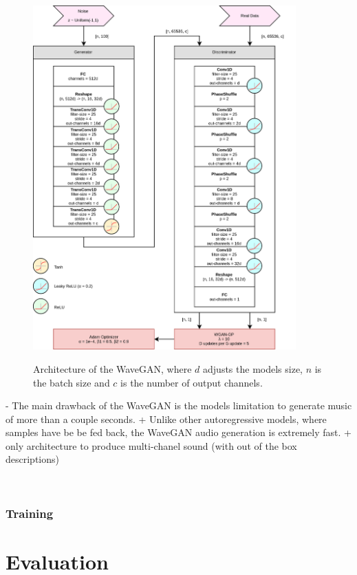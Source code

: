 \documentclass[12pt]{article}
\begin{document}
\begin{figure}
\includegraphics[width=0.9\textwidth]{img/wavegan-arch.png}
\label{fig:WaveGan-arch}
\caption{Architecture of the WaveGAN, where $d$ adjusts the models size, $n$ is the batch size and $c$ is the number of output channels.}%
\end{figure}




- The main drawback of the WaveGAN is the models limitation to generate music of more than a couple seconds.
+ Unlike other autoregressive models, where samples have be be fed back, the WaveGAN audio generation is extremely fast.
+ only architecture to produce multi-chanel sound (with out of the box descriptions)

 
 
\cite{donahue2018adversarial} %


\subsubsection{Training}

\section{Evaluation}
\end{document}
